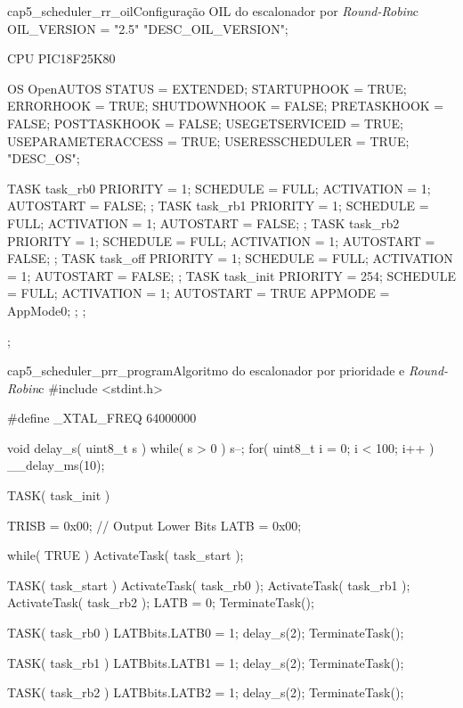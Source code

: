 \begin{algoritmo}{cap5_scheduler_rr_oil}{Configuração OIL do escalonador por \emph{Round-Robin}}{c}
OIL_VERSION = "2.5" "DESC_OIL_VERSION";

CPU PIC18F25K80 {
	OS OpenAUTOS {
		STATUS = EXTENDED;
		STARTUPHOOK = TRUE;
		ERRORHOOK = TRUE;
		SHUTDOWNHOOK = FALSE;
		PRETASKHOOK = FALSE;
		POSTTASKHOOK = FALSE;
		USEGETSERVICEID = TRUE;
		USEPARAMETERACCESS = TRUE;
		USERESSCHEDULER = TRUE;
	} "DESC_OS";
	
	TASK task_rb0 {
		PRIORITY = 1;
		SCHEDULE = FULL;
		ACTIVATION = 1;
		AUTOSTART = FALSE;
	};
	TASK task_rb1 {
		PRIORITY = 1;
		SCHEDULE = FULL;
		ACTIVATION = 1;
		AUTOSTART = FALSE;
	};
	TASK task_rb2 {
		PRIORITY = 1;
		SCHEDULE = FULL;
		ACTIVATION = 1;
		AUTOSTART = FALSE;
	};
	TASK task_off {
		PRIORITY = 1;
		SCHEDULE = FULL;
		ACTIVATION = 1;
		AUTOSTART = FALSE;
	};
	TASK task_init {
		PRIORITY = 254;
		SCHEDULE = FULL;
		ACTIVATION = 1;
		AUTOSTART = TRUE {
			APPMODE = AppMode0;
		};
	};	
};
\end{algoritmo}

\begin{algoritmo}{cap5_scheduler_prr_program}{Algoritmo do escalonador por prioridade e \emph{Round-Robin}}{c}
#include <stdint.h>

#define _XTAL_FREQ 64000000

void delay_s( uint8_t s ) {
	while( s > 0 ) {
		s--;
		for( uint8_t i = 0; i < 100; i++ ) {
			__delay_ms(10);
		}
	}
}

TASK( task_init ) {
	TRISB = 0x00; // Output Lower Bits
	LATB = 0x00;
	
	while( TRUE ) {
		ActivateTask( task_start );		
	}
}

TASK( task_start ) {		
	ActivateTask( task_rb0 );
	ActivateTask( task_rb1 );
	ActivateTask( task_rb2 );	
	LATB = 0;
	TerminateTask();
}

TASK( task_rb0 ) {
	LATBbits.LATB0 = 1;
	delay_s(2);
	TerminateTask();
}

TASK( task_rb1 ) {
	LATBbits.LATB1 = 1;
	delay_s(2);
	TerminateTask();
}

TASK( task_rb2 ) {
	LATBbits.LATB2 = 1;
	delay_s(2);
	TerminateTask();
}
\end{algoritmo}

